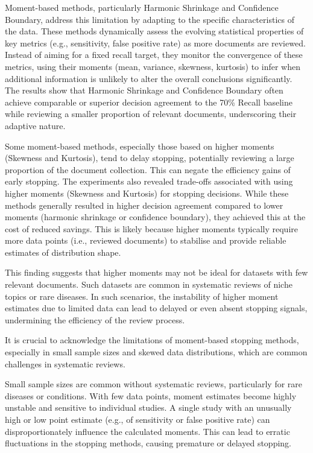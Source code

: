 \documentclass[sigconf,natbib=true,anonymous=true]{acmart}
\begin{document}
Moment-based methods, particularly Harmonic Shrinkage and Confidence Boundary, address this limitation by adapting to the specific characteristics of the data. These methods dynamically assess the evolving statistical properties of key metrics (e.g., sensitivity, false positive rate) as more documents are reviewed. Instead of aiming for a fixed recall target, they monitor the convergence of these metrics, using their moments (mean, variance, skewness, kurtosis) to infer when additional information is unlikely to alter the overall conclusions significantly. The results show that Harmonic Shrinkage and Confidence Boundary often achieve comparable or superior decision agreement to the 70\% Recall baseline while reviewing a smaller proportion of relevant documents, underscoring their adaptive nature.


Some moment-based methods, especially those based on higher moments (Skewness and Kurtosis), tend to delay stopping, potentially reviewing a large proportion of the document collection. This can negate the efficiency gains of early stopping. The experiments also revealed trade-offs associated with using higher moments (Skewness and Kurtosis) for stopping decisions. While these methods generally resulted in higher decision agreement compared to lower moments (harmonic shrinkage or confidence boundary), they achieved this at the cost of reduced savings. This is likely because higher moments typically require more data points (i.e., reviewed documents) to stabilise and provide reliable estimates of distribution shape.

This finding suggests that higher moments may not be ideal for datasets with few relevant documents. Such datasets are common in systematic reviews of niche topics or rare diseases. In such scenarios, the instability of higher moment estimates due to limited data can lead to delayed or even absent stopping signals, undermining the efficiency of the review process.

It is crucial to acknowledge the limitations of moment-based stopping methods, especially in small sample sizes and skewed data distributions, which are common challenges in systematic reviews.

Small sample sizes are common without systematic reviews, particularly for rare diseases or conditions. With few data points, moment estimates become highly unstable and sensitive to individual studies. A single study with an unusually high or low point estimate (e.g., of sensitivity or false positive rate) can disproportionately influence the calculated moments. This can lead to erratic fluctuations in the stopping methods, causing premature or delayed stopping.
\end{document}
